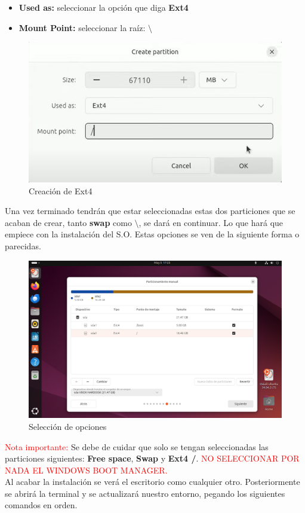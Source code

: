 \documentclass[letter,11pt]{article} %
\begin{document}
\begin{enumerate}
		\begin{itemize}
			\item \textbf{Used as:} seleccionar la opción que diga \textbf{Ext4}
			\item \textbf{Mount Point:} seleccionar la raíz: \textbf{$\setminus$}
		\end{itemize}
		
		\begin{figure}[H]
			\centering
			\includegraphics[width=0.4\linewidth]{Imagenes/ext4}
			\caption{Creación de Ext4}
			\label{fig:ext4}
		\end{figure}
		
		
		Una vez terminado tendrán que estar seleccionadas estas dos particiones que se acaban de crear, tanto \textbf{swap} como \textbf{$\setminus$}, se dará en continuar. Lo que hará que empiece con la instalación del S.O. Estas opciones se ven de la siguiente forma o parecidas.\\
		
		\begin{figure}[H]
			\centering
			\includegraphics[width=0.5\linewidth]{Imagenes/opciones}
			\caption{Selección de opciones}
			\label{fig:opciones}
		\end{figure}
		
		\textcolor{red}{Nota importante:} Se debe de cuidar que solo se tengan seleccionadas las particiones siguientes: \textbf{Free space}, \textbf{Swap} y \textbf{Ext4 /}. \textcolor{red}{NO SELECCIONAR POR NADA EL WINDOWS BOOT MANAGER.}\\
		
		
		Al acabar la instalación se verá el escritorio como cualquier otro. Posteriormente se abrirá la terminal y se actualizará nuestro entorno, pegando los siguientes comandos en orden.\\
		

\end{enumerate}
\end{document}
